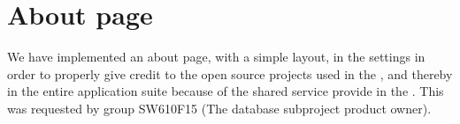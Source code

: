
\section{About page}
\label{sec:about_page}

We have implemented an about page, with a simple layout, in the \launcher settings in order to properly give credit to the open source projects used in the \launcher, and thereby in the entire \giraf application suite because of the shared service provide in the \launcher. This was requested by group SW610F15 (The database subproject product owner). 

